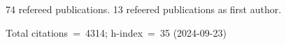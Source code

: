 74 refereed publications. 13 refeered publications as first author.

Total citations~=~4314; h-index~=~35 (2024-09-23)